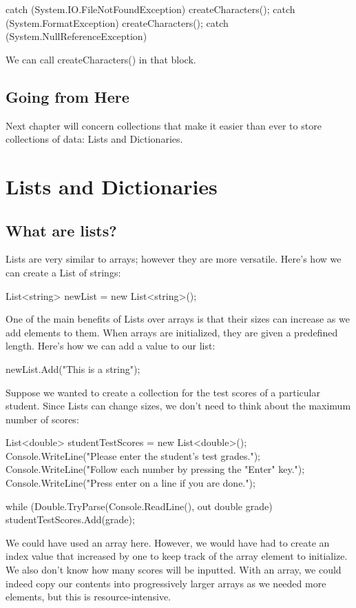 \documentclass[oneside, openany] {book}
\begin{document}
\begin{CSharp}
catch (System.IO.FileNotFoundException)
{
  createCharacters();
}
catch (System.FormatException)
{
  createCharacters();
}
catch (System.NullReferenceException)
{
}
\end{CSharp}

We can call createCharacters() in that block.

\section*{Going from Here}
Next chapter will concern collections that make it easier than ever to store collections of data: Lists and Dictionaries.
\chapter{Lists and Dictionaries}
\minitoc
{}
\section{What are lists?}
Lists are very similar to arrays; however they are more versatile. Here's how we can create a List of strings:

\begin{CSharp}
List<string> newList = new List<string>();
\end{CSharp}

One of the main benefits of Lists over arrays is that their sizes can increase as we add elements to them. When arrays are initialized, they are given a predefined length. Here's how we can add a value to our list:
\begin{CSharp}
newList.Add("This is a string");
\end{CSharp}

Suppose we wanted to create a collection for the test scores of a particular student. Since Lists can change sizes, we don't need to think about the maximum number of scores:

\begin{CSharp}
List<double> studentTestScores = new List<double>();
Console.WriteLine("Please enter the student's test grades.");
Console.WriteLine("Follow each number by pressing the "Enter" key.");
Console.WriteLine("Press enter on a line if you are done.");

while (Double.TryParse(Console.ReadLine(), out double grade)
{
  studentTestScores.Add(grade);
}
\end{CSharp}
We could have used an array here. However, we would have had to create an index value that increased by one to keep track of the array element to initialize.
We also don't know how many scores will be inputted. With an array, we could indeed copy our contents into progressively larger arrays as we needed more elements, but this is resource-intensive.
\end{document}
